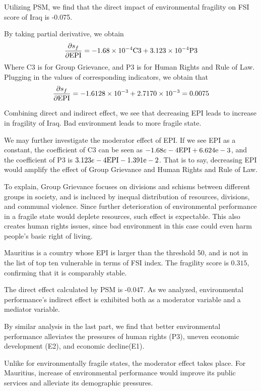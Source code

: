 Utilizing PSM, we find that the direct impact of environmental fragility on FSI score of Iraq is -0.075.

By taking partial derivative, we obtain
$$
\frac{\partial{s_f}}{\partial{\rm{EPI}}} = -1.68 \times 10^{-4} \rm{C3} + 3.123 \times 10^{-4}\rm{P3}
$$
Where C3 is for Group Grievance, and P3 is for Human Rights and Rule of Law. 
Plugging in the values of corresponding indicators, we obtain that  
$$
\frac{\partial{s_f}}{\partial{\rm{EPI}}} = -1.6128\times 10^{-3} +2.7170 \times 10^{-3} = 0.0075 $$

Combining direct and indirect effect, we see that decreasing EPI leads to increase in fragility of Iraq. Bad environment leads to more fragile state.

We may further investigate the moderator effect of EPI. If we see EPI as a constant, the coefficient of C3 can be seen as $-1.68e-4\rm{EPI}+6.624e-3$, and the coefficient of P3 is $3.123e-4\rm{EPI} - 1.391e-2 $. That is to say, decreasing EPI would amplify the effect of Group Grievance and Human Rights and Rule of Law. 

To explain, Group Grievance focuses on divisions and schisms between different groups in society, and is incluced by inequal distribution of resources, divisions, and communal violence.
Since further deterioration of environmental performance in a fragile state would deplete resources, such effect is expectable. This also creates human rights issues, since bad environment in this case could even harm people's basic right of living. 

Mauritius is a country whose EPI is larger than the threshold 50, and is not in the list of top ten vulnerable in terms of FSI index. The fragility score is $0.315$, confirming that it is comparably stable.

The direct effect calculated by PSM is -0.047. As we analyzed, environmental performance's indirect effect is exhibited both as a moderator variable and a mediator variable. 

By similar analysis in the last part, we find that better environmental performance alleviates the pressures of human rights (P3), uneven economic development (E2), and economic decline(E1). 

Unlike for environmentally fragile states, the moderator effect takes place. For Mauritius, increase of environmental performance would improve its public services and alleviate its demographic pressures.



